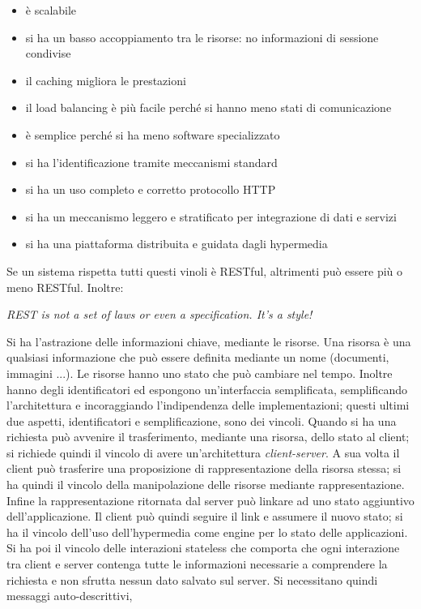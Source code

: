 \documentclass[a4paper,12pt, oneside]{book}
\begin{document}
\begin{itemize}
\item è scalabile
\item si ha un basso accoppiamento tra le risorse: no informazioni di sessione condivise
\item il caching migliora le prestazioni
\item il load balancing è più facile perché si hanno meno stati di comunicazione
\item è semplice perché si ha  meno software specializzato
\item si ha l'identificazione tramite meccanismi standard
\item si ha un uso completo e corretto protocollo HTTP
\item si ha un meccanismo leggero e stratificato per integrazione di dati e servizi
\item si ha una piattaforma distribuita e guidata dagli hypermedia
\end{itemize}
Se un sistema rispetta tutti questi vinoli è RESTful, altrimenti può essere più o meno RESTful. Inoltre:
\begin{center}
\textit{REST is not a set of laws or even a specification. It’s a style!}
\end{center}
Si ha l'astrazione delle informazioni chiave, mediante le risorse. Una risorsa è una qualsiasi informazione che può essere definita
mediante un nome (documenti, immagini ...). Le risorse hanno uno stato che può cambiare nel tempo. Inoltre hanno degli identificatori ed
espongono un'interfaccia semplificata, semplificando l'architettura e incoraggiando l'indipendenza delle implementazioni;
questi ultimi due aspetti, identificatori e semplificazione, sono dei vincoli. Quando si ha una richiesta può avvenire il trasferimento,
mediante una risorsa, dello stato al client; si richiede quindi il vincolo di avere un'architettura \textit{client-server}. A sua volta il client può
trasferire una proposizione di rappresentazione della risorsa stessa; si ha quindi il vincolo della manipolazione delle risorse mediante rappresentazione.
Infine la rappresentazione ritornata dal server può linkare ad uno stato aggiuntivo dell'applicazione. Il client può quindi seguire il link
e assumere il nuovo stato; si ha il vincolo dell'uso dell'hypermedia come engine per lo stato delle applicazioni.\\
Si ha poi il vincolo delle interazioni stateless che comporta che ogni interazione tra client e server contenga tutte le informazioni
necessarie a comprendere la richiesta e non sfrutta nessun dato salvato sul server. Si necessitano quindi messaggi auto-descrittivi,
\end{document}
